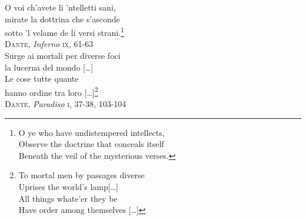 \documentclass[11pt,fleqn]{book} %
\begin{document}
\vspace*{\fill}
\begin{flushright}
	\raggedleft
	O voi ch'avete li 'ntelletti sani,\\
	mirate la dottrina che s'asconde\\
	sotto 'l velame de li versi strani.\footnote{O ye who have undistempered intellects,\\
		Observe the doctrine that conceals itself\\
		Beneath the veil of the mysterious verses.}\\[.4cm]
	\textsc{Dante}, \textit{Inferno} \textsc{ix}, 61-63\\[1.5cm]
	Surge ai mortali per diverse foci\\
	la lucerna del mondo [\ldots] \\
	Le cose tutte quante\\
	hanno ordine tra loro [\ldots]\footnote{To mortal men by passages diverse\\
		Uprises the world's lamp[\ldots]\\
		All things whate'er they be\\
		Have order among themselves [\ldots]}\\[.4cm]
	\textsc{Dante}, \textit{Paradiso} \textsc{i}, 37-38, 103-104\\[1.5cm]
\end{flushright}
	
	\vspace{.7cm}
	
\end{document}
